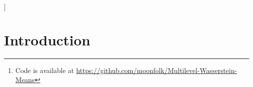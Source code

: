 



\vskip 0.3in
]



\printAffiliationsAndNotice{}

\begin{abstract} 
We propose a novel approach to the problem of multilevel clustering, which aims to 
simultaneously partition data in each group and discover grouping patterns among groups
in a potentially large hierarchically structured corpus of data.
Our method involves a joint optimization formulation over several spaces of discrete probability measures,
which are endowed with Wasserstein distance metrics. We propose a number of variants
of this problem, which admit fast optimization algorithms, by exploiting the connection to the
problem of finding Wasserstein barycenters.  Consistency properties are established
for the estimates of both local and global clusters.
Finally, experiment results with both synthetic and real data are presented to demonstrate the 
flexibility and scalability of the proposed approach. \footnote{Code is available at \url{https://github.com/moonfolk/Multilevel-Wasserstein-Means}}
\end{abstract} 
\section{Introduction} \label{Section:introduction}


